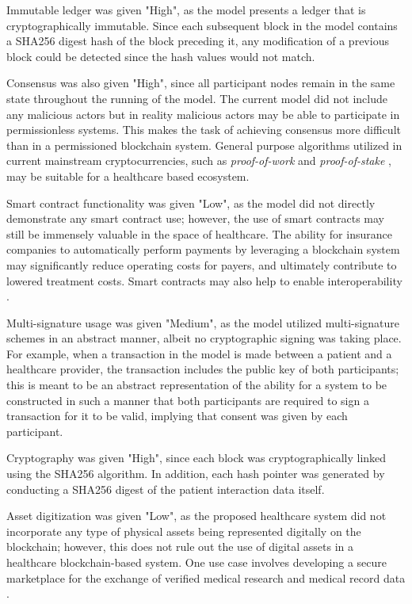 \documentclass[12pt]{report}
\begin{document}
Immutable ledger was given "High", as the model presents a ledger that is cryptographically immutable. Since each subsequent block in the model contains a SHA256 digest hash of the block preceding it, any modification of a previous block could be detected since the hash values would not match. 

Consensus was also given "High", since all participant nodes remain in the same state throughout the running of the model. The current model did not include any malicious actors but in reality malicious actors may be able to participate in permissionless systems. This makes the task of achieving consensus more difficult than in a permissioned blockchain system. General purpose algorithms utilized in current mainstream cryptocurrencies, such as \textit{proof-of-work} \cite{Nakamoto.2008} and \textit{proof-of-stake} \cite{Buterin.2014}, may be suitable for a healthcare based ecosystem. 

Smart contract functionality was given "Low", as the model did not directly demonstrate any smart contract use; however, the use of smart contracts may still be immensely valuable in the space of healthcare. The ability for insurance companies to automatically perform payments by leveraging a blockchain system may significantly reduce operating costs for payers, and ultimately contribute to lowered treatment costs. Smart contracts may also help to enable interoperability \cite{PengZhang.}.

Multi-signature usage was given "Medium", as the model utilized multi-signature schemes in an abstract manner, albeit no cryptographic signing was taking place. For example, when a transaction in the model is made between a patient and a healthcare provider, the transaction includes the public key of both participants; this is meant to be an abstract representation of the ability for a system to be constructed in such a manner that both participants are required to sign a transaction for it to be valid, implying that consent was given by each participant. 

Cryptography was given "High", since each block was cryptographically linked using the SHA256 algorithm. In addition, each hash pointer was generated by conducting a SHA256 digest of the patient interaction data itself. 

Asset digitization was given "Low", as the proposed healthcare system did not incorporate any type of physical assets being represented digitally on the blockchain; however, this does not rule out the use of digital assets in a healthcare blockchain-based system. One use case involves developing a secure marketplace for the exchange of verified medical research and medical record data \cite{.b}.
\end{document}
